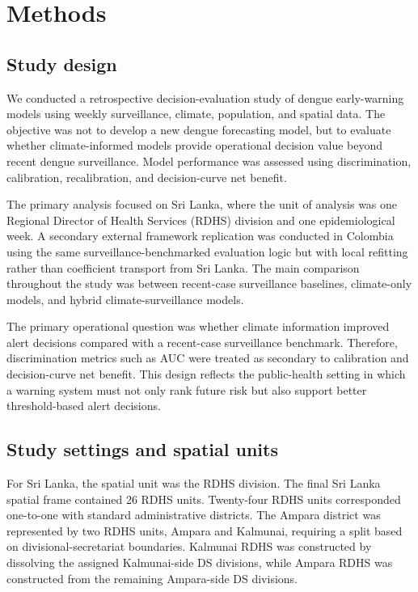 \documentclass[11pt,a4paper]{article}
\begin{document}
\section{Methods}
\label{sec:methods}

\subsection{Study design}
\label{subsec:study-design}

We conducted a retrospective decision-evaluation study of dengue early-warning models using weekly surveillance, climate, population, and spatial data. The objective was not to develop a new dengue forecasting model, but to evaluate whether climate-informed models provide operational decision value beyond recent dengue surveillance. Model performance was assessed using discrimination, calibration, recalibration, and decision-curve net benefit.

The primary analysis focused on Sri Lanka, where the unit of analysis was one Regional Director of Health Services (RDHS) division and one epidemiological week. A secondary external framework replication was conducted in Colombia using the same surveillance-benchmarked evaluation logic but with local refitting rather than coefficient transport from Sri Lanka. The main comparison throughout the study was between recent-case surveillance baselines, climate-only models, and hybrid climate-surveillance models.

The primary operational question was whether climate information improved alert decisions compared with a recent-case surveillance benchmark. Therefore, discrimination metrics such as AUC were treated as secondary to calibration and decision-curve net benefit. This design reflects the public-health setting in which a warning system must not only rank future risk but also support better threshold-based alert decisions.

\subsection{Study settings and spatial units}
\label{subsec:settings-spatial-units}

For Sri Lanka, the spatial unit was the RDHS division. The final Sri Lanka spatial frame contained 26 RDHS units. Twenty-four RDHS units corresponded one-to-one with standard administrative districts. The Ampara district was represented by two RDHS units, Ampara and Kalmunai, requiring a split based on divisional-secretariat boundaries. Kalmunai RDHS was constructed by dissolving the assigned Kalmunai-side DS divisions, while Ampara RDHS was constructed from the remaining Ampara-side DS divisions.
\end{document}
